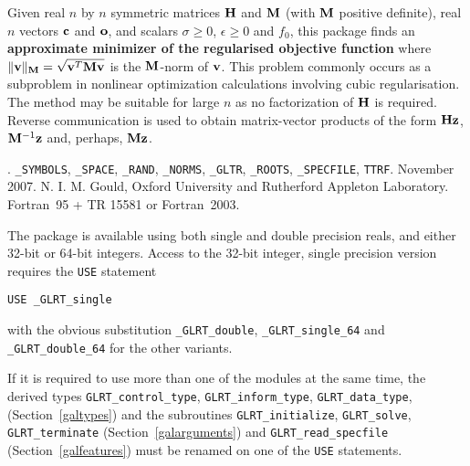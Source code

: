 \documentclass{galahad}
\newcommand{\packagename}{GL\-RT}
\newcommand{\fullpackagename}{\libraryname\_\packagename}
\begin{document}
\galheader


\galsummary
Given real $n$ by $n$ symmetric matrices ${\mathbf{H}}$ and ${\mathbf{M}}$
(with ${\mathbf{M}}$ positive definite), real
$n$ vectors ${\mathbf{c}}$ and ${\mathbf{o}}$, and scalars $\sigma\geq 0$, $\epsilon\geq 0$
and $f_0$, this package finds an
{\bf approximate minimizer of the regularised objective function}
where $\|  {\mathbf{v}} \|_{{\mathbf{M}}} = \sqrt{{\mathbf{v}}^T {\mathbf{M}} {\mathbf{v}}}$ is
the ${\mathbf{M}}$-norm of ${\mathbf{v}}$.
This problem commonly occurs as a subproblem in nonlinear
optimization calculations involving cubic regularisation.
The method may be suitable for large $n$ as no factorization of ${\mathbf{H}}$ is
required. Reverse communication is used to obtain
matrix-vector products of the form ${\mathbf{H}} {\mathbf{z}}$, ${\mathbf{M}}^{-1} {\mathbf{z}}$
and, perhaps, ${\mathbf{M}} {\mathbf{z}}$.



\galattributes
\galversions{\tt  \fullpackagename\_single, \fullpackagename\_double}.
\galuses
{\tt \libraryname\_SY\-M\-BOLS},
{\tt \libraryname\_SPACE}, {\tt \libraryname\_\-RAND},
{\tt \libraryname\_\-NORMS}, {\tt \libraryname\_\-GLTR},
{\tt \libraryname\_ROOTS}, {\tt \libraryname\_SPECFILE},
{\tt *TTRF}.
\galdate November 2007.
\galorigin N. I. M. Gould, Oxford University and Rutherford Appleton Laboratory.
\gallanguage Fortran~95 + TR 15581 or Fortran~2003.


\galhowto

The package is available using both single and double precision reals, 
and either 32-bit or 64-bit integers. Access to the 32-bit integer,
single precision version requires the {\tt USE} statement
\medskip

\hspace{8mm} {\tt USE \fullpackagename\_single}

\medskip
\noindent
with the obvious substitution {\tt \fullpackagename\_double},
{\tt \fullpackagename\_single\_64} and 
{\tt \fullpackagename\_double\_64} for the other variants.

\noindent
If it is required to use more than one of the modules at the same time, 
the derived types
{\tt \packagename\_control\_type}, {\tt \packagename\_inform\_type},
{\tt \packagename\_data\_type},
(Section~\ref{galtypes})
and the subroutines
{\tt \packagename\_initialize},
{\tt \packagename\_solve}, {\tt \packagename\_terminate}
(Section~\ref{galarguments})
and
{\tt \packagename\_read\_specfile}
(Section~\ref{galfeatures})
must be renamed on one of the {\tt USE} statements.
\end{document}
